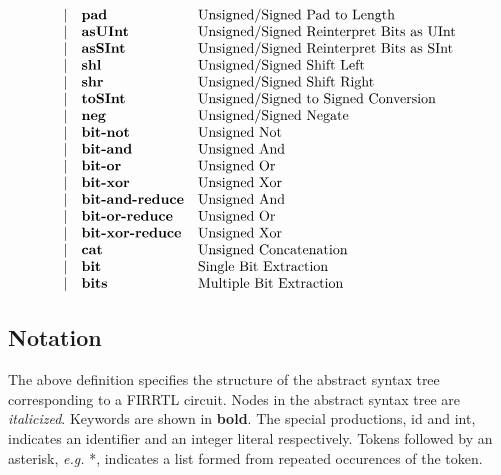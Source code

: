\documentclass[12pt]{article}
\begin{document}
\[\begin{array}{rll}
\vert           &\text{\bf pad}            &\text{Unsigned/Signed Pad to Length}\\
\vert           &\text{\bf asUInt}         &\text{Unsigned/Signed Reinterpret Bits as UInt}\\
\vert           &\text{\bf asSInt}         &\text{Unsigned/Signed Reinterpret Bits as SInt}\\
\vert           &\text{\bf shl}            &\text{Unsigned/Signed Shift Left}\\
\vert           &\text{\bf shr}            &\text{Unsigned/Signed Shift Right}\\
\vert           &\text{\bf toSInt}        &\text{Unsigned/Signed to Signed Conversion}\\
\vert           &\text{\bf neg}            &\text{Unsigned/Signed Negate}\\
\vert           &\text{\bf bit-not}        &\text{Unsigned Not}\\
\vert           &\text{\bf bit-and}        &\text{Unsigned And}\\
\vert           &\text{\bf bit-or}         &\text{Unsigned Or}\\
\vert           &\text{\bf bit-xor}        &\text{Unsigned Xor}\\
\vert           &\text{\bf bit-and-reduce} &\text{Unsigned And}\\
\vert           &\text{\bf bit-or-reduce}  &\text{Unsigned Or}\\
\vert           &\text{\bf bit-xor-reduce} &\text{Unsigned Xor}\\
\vert           &\text{\bf cat}         &\text{Unsigned Concatenation}\\
\vert           &\text{\bf bit}            &\text{Single Bit Extraction}\\
\vert           &\text{\bf bits}           &\text{Multiple Bit Extraction}\\
\end{array}
\]

\subsection{Notation}
The above definition specifies the structure of the abstract syntax tree corresponding to a FIRRTL circuit. Nodes in the abstract syntax tree are {\em italicized}. Keywords are shown in {\bf bold}. The special productions, id and int, indicates an identifier and an integer literal respectively. Tokens followed by an asterisk, {\em e.g.} *, indicates a list formed from repeated occurences of the token.
\end{document}
